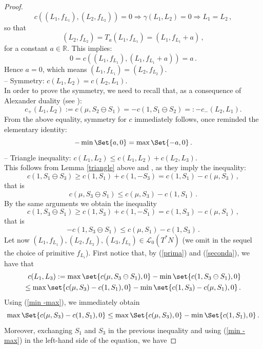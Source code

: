 \documentclass{article}
\newcommand{\1}{\mathbbm{1}}
\theoremstyle{remark}
\begin{document}
{{\begin{proof}
$$c((L_1,f_{L_1}),(L_2, f_{L_2})) = 0 \Rightarrow \gamma(L_1,L_2) = 0 \Rightarrow L_1 = L_2\, ,$$
so that 
$$(L_2,f_{L_2}) = T_a (L_1,f_{L_1}) = (L_1,f_{L_1}+a)\, ,$$
for a constant $a \in \mathbb{R}$. This implies: 
$$0 = c((L_1,f_{L_1}),(L_1,f_{L_1}+a)) = a\, .$$
Hence $a = 0$, which means $(L_1, f_{L_1}) = (L_2, f_{L_2})$. \\
-- Symmetry: $c(L_1,L_2) = c(L_2,L_1)$. \\
In order to prove the symmetry, we need to recall that, as a consequence of Alexander duality (see \cite[Corollary 2.8.]{vit92}):
$$c_+(L_1,L_2):= c(\mu, S_2 \ominus S_1) = -c(1,S_1 \ominus S_2) =: -c_-(L_2,L_1).$$
From the above equality, symmetry for $c$ immediately follows, once reminded the elementary identity:
\begin{equation} \label{min -max}
    -\min\Set{a, 0}=\max\Set{-a, 0}\, .
\end{equation}
-- Triangle inequality: $c(L_1,L_2) \le c(L_1,L_2) + c(L_2,L_3)$. \\
This follows from Lemma \ref{triangle} above and \cite[Corollary 2.8.]{vit92}, as they imply the inequality:
$$c(1,S_1 \ominus S_3) \ge c(1,S_1) + c(1,-S_3) = c(1,S_1) - c(\mu,S_3)\, ,$$
that is
\begin{equation} \label{prima}
c(\mu,S_3 \ominus S_1) \le c(\mu,S_3) - c(1,S_1)\, . 
\end{equation}
By the same arguments we obtain the inequality
$$c(1,S_3 \ominus S_1) \ge c(1,S_3) + c(1,-S_1) = c(1,S_3) - c(\mu,S_1)\, ,$$
that is
\begin{equation} \label{seconda}
-c(1,S_3 \ominus S_1) \le c(\mu,S_1) - c(1,S_3)\, . 
\end{equation}
\noindent Let now $(L_1, f_{L_1}), (L_2, f_{L_2}), (L_3, f_{L_3}) \in \mathscr{L}_0(T^*N)$ (we omit in the sequel the choice of primitive $f_{L_i}$).
First notice that, by (\ref{prima}) and (\ref{seconda}), we have that
\begin{eqnarray} \label{pre}
c(L_1,L_3) := \max \set{c(\mu,S_3\ominus S_1),0} -\min \set{c(1,S_3\ominus S_1),0} \nonumber \\
\le \max \set{c(\mu,S_3) -c(1,S_1), 0} -\min \set{c(1,S_3)-c(\mu,S_1),0}\, .
\end{eqnarray}
Using (\ref{min -max}), we immediately obtain 
\begin{equation}\label{eq:triangIneqC1}
    \max\Set{c(\mu, S_3)-c(1, S_1), 0}\leq \max\Set{c(\mu, S_3), 0}-\min\Set{c(1, S_1), 0}\, .
\end{equation} 
Moreover, exchanging $S_1$ and $S_3$ in the previous inequality and using (\ref{min -max}) in the left-hand side of the equation, we  have 

\end{proof}}}
\end{document}
